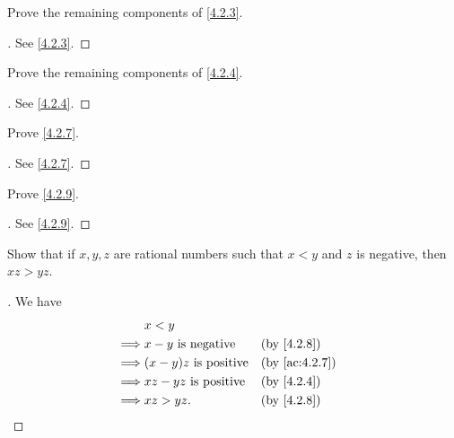 \begin{ex}\label{ex:4.2.2}
  Prove the remaining components of \cref{4.2.3}.
\end{ex}

\begin{proof}[]
  See \cref{4.2.3}.
\end{proof}

\begin{ex}\label{ex:4.2.3}
  Prove the remaining components of \cref{4.2.4}.
\end{ex}

\begin{proof}[]
  See \cref{4.2.4}.
\end{proof}

\begin{ex}\label{ex:4.2.4}
  Prove \cref{4.2.7}.
\end{ex}

\begin{proof}[]
  See \cref{4.2.7}.
\end{proof}

\begin{ex}\label{ex:4.2.5}
  Prove \cref{4.2.9}.
\end{ex}

\begin{proof}[]
  See \cref{4.2.9}.
\end{proof}

\begin{ex}\label{ex:4.2.6}
  Show that if \(x, y, z\) are rational numbers such that \(x < y\) and \(z\) is negative, then \(xz > yz\).
\end{ex}

\begin{proof}[]
  We have
  \begin{align*}
             & x < y                                           \\
    \implies & x - y \text{ is negative}    &  & \by{4.2.8}    \\
    \implies & (x - y)z \text{ is positive} &  & \by{ac:4.2.7} \\
    \implies & xz - yz \text{ is positive}  &  & \by{4.2.4}    \\
    \implies & xz > yz.                     &  & \by{4.2.8}
  \end{align*}
\end{proof}
